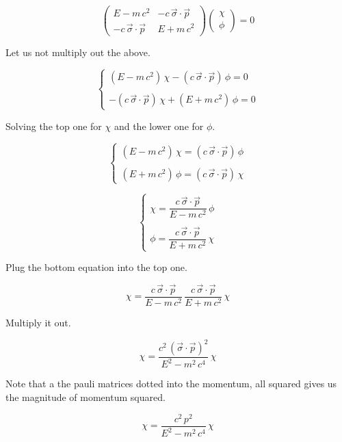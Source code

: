 \documentclass[a4page,12pt]{article}
\begin{document}
	\[
		\begin{pmatrix}
			E - m\,c^2 & - c \,\vec{\sigma}\cdot\vec{p} \\
			-c \,\vec{\sigma}\cdot\vec{p} & E + m\,c^2 
		\end{pmatrix}
		\begin{pmatrix}
			\chi \\
			\phi
		\end{pmatrix}
		= 0
	\]

	Let us not multiply out the above.

	\[
	 \begin{cases} 
	      \left(E - m\,c^2\right) \, \chi - \left(c \,\vec{\sigma}\cdot\vec{p}\right) \, \phi = 0 \\\\
	      - \left(c \,\vec{\sigma}\cdot\vec{p}\right) \, \chi + \left(E + m\,c^2\right) \, \phi= 0
  	\end{cases}
	\]
	
	Solving the top one for $\chi$ and the lower one for $\phi$.

	\[
	 \begin{cases} 
	      \left(E - m\,c^2\right) \, \chi = \left(c \,\vec{\sigma}\cdot\vec{p}\right) \, \phi \\\\
	      \left(E + m\,c^2\right) \, \phi= \left(c \,\vec{\sigma}\cdot\vec{p}\right)\, \chi
  	\end{cases}
	\]
	
	\[
	 \begin{cases} 
	      \chi = \dfrac{c \,\vec{\sigma}\cdot\vec{p}}{E - m\,c^2} \, \phi \\\\
	      \phi= \dfrac{c \,\vec{\sigma}\cdot\vec{p}}{E + m\,c^2} \, \chi
  	\end{cases}
	\]	

	Plug the bottom equation into the top one.

	\[
		\chi = \dfrac{c \,\vec{\sigma}\cdot\vec{p}}{E - m\,c^2} \, \dfrac{c \,\vec{\sigma}\cdot\vec{p}}{E + m\,c^2} \, \chi
	\]

	Multiply it out.
	
	\[
		\chi = \dfrac{c^2 \,\left(\vec{\sigma}\cdot\vec{p}\right)^2}{E^2 - m^2\,c^4} \, \chi
	\]
	
	Note that a the pauli matrices dotted into the momentum, all squared gives us the magnitude of momentum squared.

	\[
		\chi = \dfrac{c^2 \,p^2}{E^2 - m^2\,c^4} \, \chi
	\]
\end{document}
